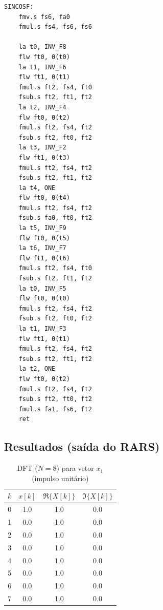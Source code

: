 \documentclass[12pt,a4paper]{article}
\begin{document}
\begin{lstlisting}[language=Assembly, caption={Programa da 3.4: DFT para x1..x4 (N=8)}]
SINCOSF:
    fmv.s fs6, fa0
    fmul.s fs4, fs6, fs6

    la t0, INV_F8
    flw ft0, 0(t0)
    la t1, INV_F6
    flw ft1, 0(t1)
    fmul.s ft2, fs4, ft0
    fsub.s ft2, ft1, ft2
    la t2, INV_F4
    flw ft0, 0(t2)
    fmul.s ft2, fs4, ft2
    fsub.s ft2, ft0, ft2
    la t3, INV_F2
    flw ft1, 0(t3)
    fmul.s ft2, fs4, ft2
    fsub.s ft2, ft1, ft2
    la t4, ONE
    flw ft0, 0(t4)
    fmul.s ft2, fs4, ft2
    fsub.s fa0, ft0, ft2
    la t5, INV_F9
    flw ft0, 0(t5)
    la t6, INV_F7
    flw ft1, 0(t6)
    fmul.s ft2, fs4, ft0
    fsub.s ft2, ft1, ft2
    la t0, INV_F5
    flw ft0, 0(t0)
    fmul.s ft2, fs4, ft2
    fsub.s ft2, ft0, ft2
    la t1, INV_F3
    flw ft1, 0(t1)
    fmul.s ft2, fs4, ft2
    fsub.s ft2, ft1, ft2
    la t2, ONE
    flw ft0, 0(t2)
    fmul.s ft2, fs4, ft2
    fsub.s ft2, ft0, ft2
    fmul.s fa1, fs6, ft2
    ret
\end{lstlisting}

\subsection*{Resultados (saída do RARS)}

\begin{table}[H]
\centering
\small
\caption{DFT ($N=8$) para vetor $x_1$ (impulso unitário)}
\label{tab:dft_x1}
\begin{tabular}{@{}c c c c@{}}
\toprule
\textbf{$k$} & \textbf{$x[k]$} & \textbf{$\Re\{X[k]\}$} & \textbf{$\Im\{X[k]\}$} \\
\midrule
0 & 1.0    & 1.0           & 0.0 \\
1 & 0.0    & 1.0           & 0.0 \\
2 & 0.0    & 1.0           & 0.0 \\
3 & 0.0    & 1.0           & 0.0 \\
4 & 0.0    & 1.0           & 0.0 \\
5 & 0.0    & 1.0           & 0.0 \\
6 & 0.0    & 1.0           & 0.0 \\
7 & 0.0    & 1.0           & 0.0 \\
\bottomrule
\end{tabular}
\end{table}
\end{document}
